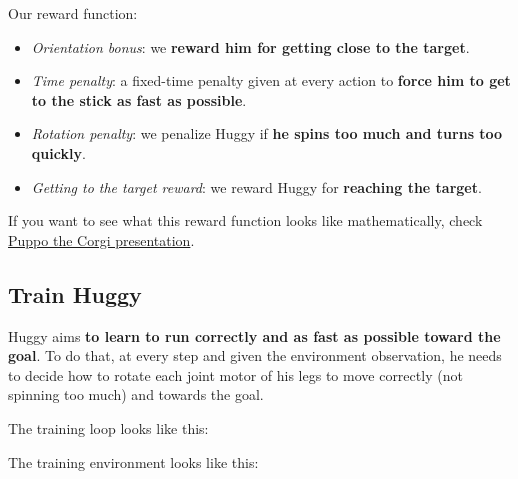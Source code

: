 \documentclass[11pt,a4paper]{article}
\begin{document}
Our reward function:


\begin{itemize}
\tightlist
\item
  \emph{Orientation bonus}: we \textbf{reward him for getting close to the target}.
\item
  \emph{Time penalty}: a fixed-time penalty given at every action to \textbf{force him to get to the stick as fast as possible}.
\item
  \emph{Rotation penalty}: we penalize Huggy if \textbf{he spins too much and turns too quickly}.
\item
  \emph{Getting to the target reward}: we reward Huggy for \textbf{reaching the target}.
\end{itemize}

If you want to see what this reward function looks like mathematically, check \href{https://blog.unity.com/technology/puppo-the-corgi-cuteness-overload-with-the-unity-ml-agents-toolkit}{Puppo the Corgi presentation}.

\subsection{Train Huggy}\label{train-huggy}

Huggy aims \textbf{to learn to run correctly and as fast as possible toward the goal}. To do that, at every step and given the environment observation, he needs to decide how to rotate each joint motor of his legs to move correctly (not spinning too much) and towards the goal.

The training loop looks like this:


The training environment looks like this:

\end{document}
